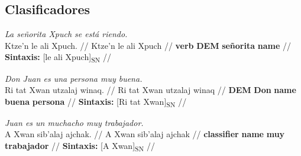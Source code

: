 \documentclass{article}%
\begin{document}
\subsection{Clasificadores}%
\label{subsec:Clasificadores}%

%
\par\medskip%
\ex
\textit{La señorita Xpuch se está riendo.} \\
\begingl
\gla Ktze'n le ali Xpuch. //
\glb Ktze'n le ali Xpuch //
\glc \textbf{verb} \textbf{DEM} \textbf{señorita} \textbf{name} //
\glft \textbf{Sintaxis:} [le ali Xpuch]\textsubscript{SN} //
\endgl
\xe
%
\medskip%
\par\medskip%
\ex
\textit{Don Juan es una persona muy buena.} \\
\begingl
\gla Ri tat Xwan utzalaj winaq. //
\glb Ri tat Xwan utzalaj winaq //
\glc \textbf{DEM} \textbf{Don} \textbf{name} \textbf{buena} \textbf{persona} //
\glft \textbf{Sintaxis:} [Ri tat Xwan]\textsubscript{SN} //
\endgl
\xe
%
\medskip%
\par\medskip%
\ex
\textit{Juan es un muchacho muy trabajador.} \\
\begingl
\gla A Xwan sib'alaj ajchak. //
\glb A Xwan sib'alaj ajchak //
\glc \textbf{classifier} \textbf{name} \textbf{muy} \textbf{trabajador} //
\glft \textbf{Sintaxis:} [A Xwan]\textsubscript{SN} //
\endgl
\xe
%
\medskip

%
\end{document}
